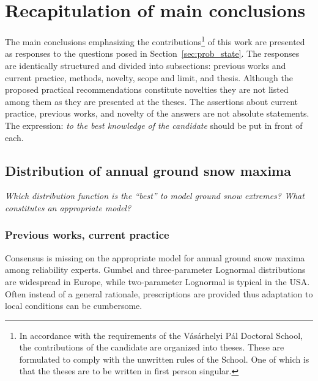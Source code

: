 \section{Recapitulation of main conclusions}

The main conclusions emphasizing the contributions\footnote{In accordance with the requirements of the Vásárhelyi Pál Doctoral School, the contributions of the candidate are organized into theses. These are formulated to comply with the unwritten rules of the School. One of which is that the theses are to be written in first person singular.} of this work are presented as responses to the questions posed in Section~\ref{sec:prob_state}. The responses are identically structured and divided into subsections: previous works and current practice, methods, novelty, scope and limit, and thesis. Although the proposed practical recommendations constitute novelties they are not listed among them as they are presented at the theses. The assertions about current practice, previous works, and novelty of the answers are not absolute statements. The expression: \textit{to the best knowledge of the candidate} should be put in front of each.

\subsection{Distribution of annual ground snow maxima}

\textit{Which distribution function is the ``best'' to model ground snow extremes? What constitutes an appropriate model?}

\subsubsection{Previous works, current practice}
Consensus is missing on the appropriate model for annual ground snow maxima among reliability experts. Gumbel and three-parameter Lognormal distributions are widespread in Europe, while two-parameter Lognormal is typical in the USA. Often instead of a general rationale, prescriptions are provided thus adaptation to local conditions can be cumbersome.

